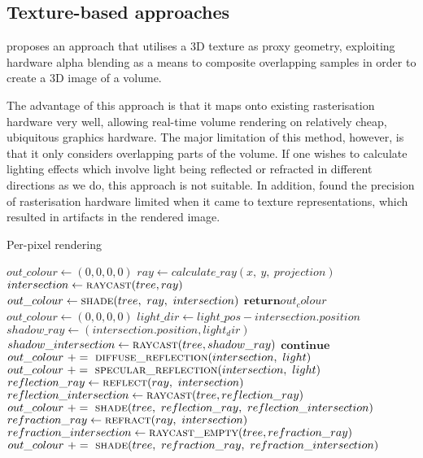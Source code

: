 \subsection{Texture-based approaches}
\cite{engel02interactivehigh-quality} proposes an approach that utilises a 3D texture as proxy geometry, exploiting hardware alpha blending as a means to composite overlapping samples in order to create a 3D image of a volume.

The advantage of this approach is that it maps onto existing rasterisation hardware very well, allowing real-time volume rendering on relatively cheap, ubiquitous graphics hardware. The major limitation of this method, however, is that it only considers overlapping parts of the volume. If one wishes to calculate lighting effects which involve light being reflected or refracted in different directions as we do, this approach is not suitable. In addition, \citeauthor{engel02interactivehigh-quality} found the precision of rasterisation hardware limited when it came to texture representations, which resulted in artifacts in the rendered image.

\begin{algorithm}
\caption{Per-pixel rendering}
\label{alg:render}
\begin{algorithmic}[1]
	\State $out\_colour \gets (0, 0, 0, 0)$
	\State $ray \gets calculate\_ray(x,~y,~projection)$
	\State $intersection \gets \Call{raycast}{tree, ray}$
		\State $out\_colour \gets \Call{shade}{tree,~ ray,~ intersection}$
	\EndIf
	\State $\textbf{return} out_colour$
\EndProcedure
\\
	\State $out\_colour \gets (0, 0, 0, 0)$
	 
		\State $light\_dir \gets light\_pos - intersection.position$ 
		\State $shadow\_ray \gets (intersection.position, light_dir)$
		\State $shadow\_intersection \gets \Call{raycast}{tree, shadow\_ray}$
			\State $\textbf{continue}$
		\EndIf
		\State $out\_colour ~+=~ \Call{diffuse\_reflection}{intersection,~light}$
		\State $out\_colour ~+=~ \Call{specular\_reflection}{intersection,~light}$
	\EndFor
	\\
	\State $reflection\_ray \gets \Call{reflect}{ray,~intersection}$ 
	\State $reflection\_intersection \gets \Call{raycast}{tree, reflection\_ray}$
		\State $out\_colour ~+=~ \Call{shade}{tree,~ reflection\_ray,~ reflection\_intersection}$
	\EndIf
	\\
	\State $refraction\_ray \gets \Call{refract}{ray,~intersection}$ 
	\State $refraction\_intersection \gets \Call{raycast\_empty}{tree, refraction\_ray}$
		\State $out\_colour ~+=~ \Call{shade}{tree,~ refraction\_ray,~ refraction\_intersection}$
	\EndIf
\EndProcedure
\end{algorithmic}
\end{algorithm}

